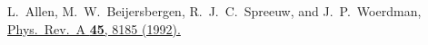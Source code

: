 \documentclass[prl,letterpaper,english,reprint,nofootinbib,aps,superscriptaddress,showpacs,showkeys]{revtex4-1}
\theoremstyle{definition}
\theoremstyle{remark}
\begin{document}
\begin{thebibliography}{10}

 L.~Allen, M.~W.~Beijersbergen, R.~J.~C.~Spreeuw, and J.~P.~Woerdman,
 \href{https://journals.aps.org/pra/pdf/10.1103/PhysRevA.45.8185}
 {Phys.~Rev.~A \textbf{45}, 8185 (1992).}





\end{thebibliography}
\end{document}
